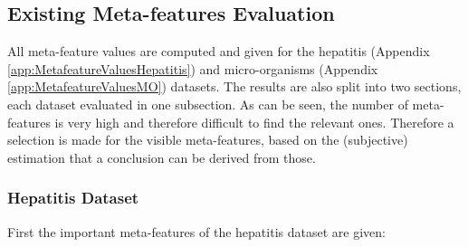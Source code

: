 \documentclass[10pt,a4paper]{report}
\begin{document}
	\subsection{Existing Meta-features Evaluation}
	\label{DEsubsec:ResultsExistingEvaluation}
	
	All meta-feature values are computed and given for the hepatitis (Appendix \ref{app:MetafeatureValuesHepatitis}) and micro-organisms (Appendix \ref{app:MetafeatureValuesMO}) datasets. The results are also split into two sections, each dataset evaluated in one subsection. As can be seen, the number of meta-features is very high and therefore difficult to find the relevant ones. Therefore a selection is made for the visible meta-features, based on the (subjective) estimation that a conclusion can be derived from those. 
	
	\subsubsection{Hepatitis Dataset}
 	\label{DEsubsec:ExistingResultHepatitis}
	
	First the important meta-features of the hepatitis dataset are given:
	
\end{document}
